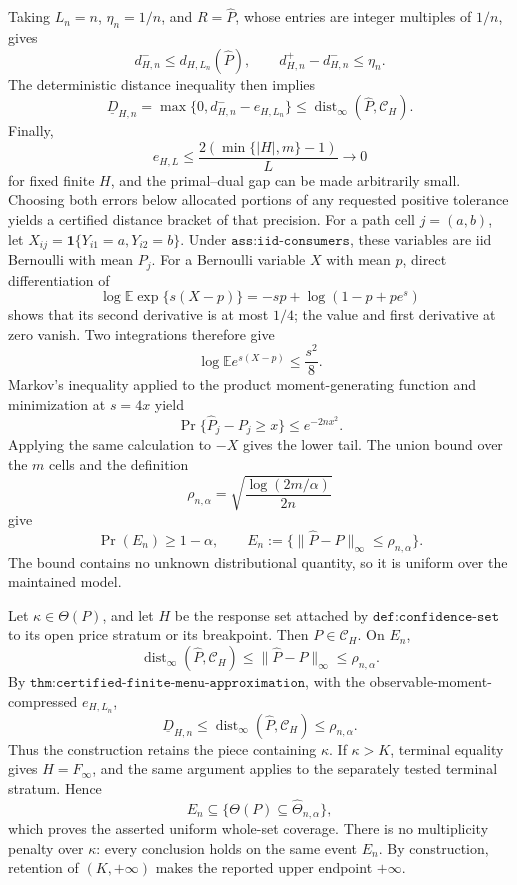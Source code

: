 Taking \(L_n=n\), \(\eta_n=1/n\), and \(R=\widehat P\), whose entries are integer multiples of \(1/n\), gives
\[
 d^-_{H,n}\le d_{H,L_n}(\widehat P),
 \qquad
 d^+_{H,n}-d^-_{H,n}\le\eta_n.
\]
The deterministic distance inequality then implies
\[
 \underline D_{H,n}
 =\max\{0,d^-_{H,n}-e_{H,L_n}\}
 \le\operatorname{dist}_\infty(\widehat P,\mathcal C_H).
\]
Finally,
\[
 e_{H,L}\le\frac{2(\min\{|H|,m\}-1)}{L}\longrightarrow0
\]
for fixed finite \(H\), and the primal--dual gap can be made arbitrarily small.  Choosing both errors below allocated portions of any requested positive tolerance yields a certified distance bracket of that precision.
For a path cell \(j=(a,b)\), let \(X_{ij}=\mathbf 1\{Y_{i1}=a,Y_{i2}=b\}\).  Under \(\texttt{ass:iid-consumers}\), these variables are iid Bernoulli with mean \(P_j\).  For a Bernoulli variable \(X\) with mean \(p\), direct differentiation of
\[
 \log\mathbb E\exp\{s(X-p)\}=-sp+\log(1-p+pe^s)
\]
shows that its second derivative is at most \(1/4\); the value and first derivative at zero vanish.  Two integrations therefore give
\[
 \log\mathbb E e^{s(X-p)}\le\frac{s^2}{8}.
\]
Markov's inequality applied to the product moment-generating function and minimization at \(s=4x\) yield
\[
 \Pr\{\widehat P_j-P_j\ge x\}\le e^{-2nx^2}.
\]
Applying the same calculation to \(-X\) gives the lower tail.  The union bound over the \(m\) cells and the definition
\[
 \rho_{n,\alpha}=\sqrt{\frac{\log(2m/\alpha)}{2n}}
\]
give
\[
 \Pr(E_n)\ge1-\alpha,
 \qquad
 E_n:=\{\|\widehat P-P\|_\infty\le\rho_{n,\alpha}\}.
\]
The bound contains no unknown distributional quantity, so it is uniform over the maintained model.

Let \(\kappa\in\Theta(P)\), and let \(H\) be the response set attached by \(\texttt{def:confidence-set}\) to its open price stratum or its breakpoint.  Then \(P\in\mathcal C_H\).  On \(E_n\),
\[
 \operatorname{dist}_\infty(\widehat P,\mathcal C_H)
 \le\|\widehat P-P\|_\infty
 \le\rho_{n,\alpha}.
\]
By \(\texttt{thm:certified-finite-menu-approximation}\), with the observable-moment-compressed \(e_{H,L_n}\),
\[
 \underline D_{H,n}
 \le\operatorname{dist}_\infty(\widehat P,\mathcal C_H)
 \le\rho_{n,\alpha}.
\]
Thus the construction retains the piece containing \(\kappa\).  If \(\kappa>K\), terminal equality gives \(H=F_\infty\), and the same argument applies to the separately tested terminal stratum.  Hence
\[
 E_n\subseteq\{\Theta(P)\subseteq\widehat\Theta_{n,\alpha}\},
\]
which proves the asserted uniform whole-set coverage.  There is no multiplicity penalty over \(\kappa\): every conclusion holds on the same event \(E_n\).  By construction, retention of \((K,+\infty)\) makes the reported upper endpoint \(+\infty\).

